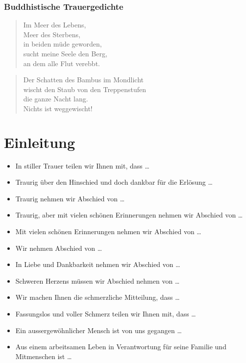 \documentclass[ngerman,a4paper,11pt]{scrreprt}
\begin{document}
\subsubsection*{Buddhistische Trauergedichte}
\label{sec-1-1-1-4-3}

\begin{verse}
Im Meer des Lebens, \\
Meer des Sterbens, \\
in beiden müde geworden, \\
sucht meine Seele den Berg, \\
an dem alle Flut verebbt. \\
\end{verse}

\begin{verse}
Der Schatten des Bambus im Mondlicht \\
wischt den Staub von den Treppenstufen \\
die ganze Nacht lang. \\
Nichts ist weggewischt! \\
\end{verse}

\clearpage

\section{Einleitung}
\label{sec-1-1-2}

\begin{itemize}
\item In stiller Trauer teilen wir Ihnen mit, dass \ldots{}
\item Traurig über den Hinschied und doch dankbar für die Erlösung \ldots{}
\item Traurig nehmen wir Abschied von \ldots{}
\item Traurig, aber mit vielen schönen Erinnerungen nehmen wir Abschied von \ldots{}
\item Mit vielen schönen Erinnerungen nehmen wir Abschied von \ldots{}
\item Wir nehmen Abschied von \ldots{}
\item In Liebe und Dankbarkeit nehmen wir Abschied von \ldots{}
\item Schweren Herzens müssen wir Abschied nehmen von \ldots{}
\item Wir machen Ihnen die schmerzliche Mitteilung, dass \ldots{}
\item Fassungslos und voller Schmerz teilen wir Ihnen mit, dass \ldots{}
\item Ein aussergewöhnlicher Mensch ist von uns gegangen \ldots{}
\item Aus einem arbeitsamen Leben in Verantwortung für seine Familie und
Mitmenschen ist \ldots{}
\end{itemize}
\end{document}
